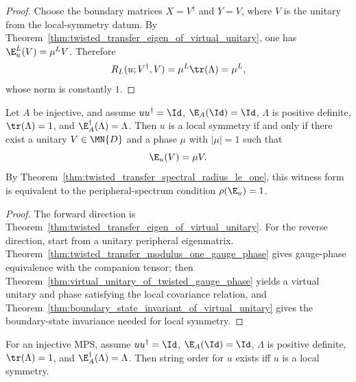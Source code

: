 \begin{proof}
    \leanok
    Choose the boundary matrices $X = V^\dagger$ and $Y = V$, where $V$ is the
    unitary from the local-symmetry datum.
    By Theorem~\ref{thm:twisted_transfer_eigen_of_virtual_unitary},
    one has $\E_u^L(V)=\mu^L V$.
    Therefore
    \[
        R_L(u;V^\dagger,V)=\mu^L \tr(\Lambda)=\mu^L,
    \]
    whose norm is constantly $1$.
\end{proof}

\begin{theorem}%
    \label{thm:local_symmetry_iff_spectral_radius}
    \leanok
    Let $A$ be injective, and assume $u u^\dagger = \Id$, $\E_A(\Id)=\Id$,
    $\Lambda$ is positive definite, $\tr(\Lambda)=1$, and
    $\E_A^\dagger(\Lambda)=\Lambda$.
    Then $u$ is a local symmetry if and only if there exist a unitary
    $V \in \MN{D}$ and a phase $\mu$ with $|\mu|=1$ such that
    \[
        \E_u(V) = \mu V.
    \]
    By Theorem~\ref{thm:twisted_transfer_spectral_radius_le_one}, this witness
    form is equivalent to the peripheral-spectrum condition $\rho(\E_u)=1$.
\end{theorem}

\begin{proof}
    \leanok
    The forward direction is Theorem~\ref{thm:twisted_transfer_eigen_of_virtual_unitary}.
    For the reverse direction, start from a unitary peripheral eigenmatrix.
    Theorem~\ref{thm:twisted_transfer_modulus_one_gauge_phase} gives
    gauge-phase equivalence with the companion tensor; then
    Theorem~\ref{thm:virtual_unitary_of_twisted_gauge_phase} yields a virtual
    unitary and phase satisfying the local covariance relation, and
    Theorem~\ref{thm:boundary_state_invariant_of_virtual_unitary} gives the
    boundary-state invariance needed for local symmetry.
\end{proof}

\begin{theorem}%
    \label{thm:string_order_iff_local_symmetry}
    \leanok
    For an injective MPS, assume $u u^\dagger = \Id$,
    $\E_A(\Id)=\Id$, $\Lambda$ is positive definite,
    $\tr(\Lambda)=1$, and $\E_A^\dagger(\Lambda)=\Lambda$. Then string
    order for $u$ exists iff $u$ is a local symmetry.
\end{theorem}

